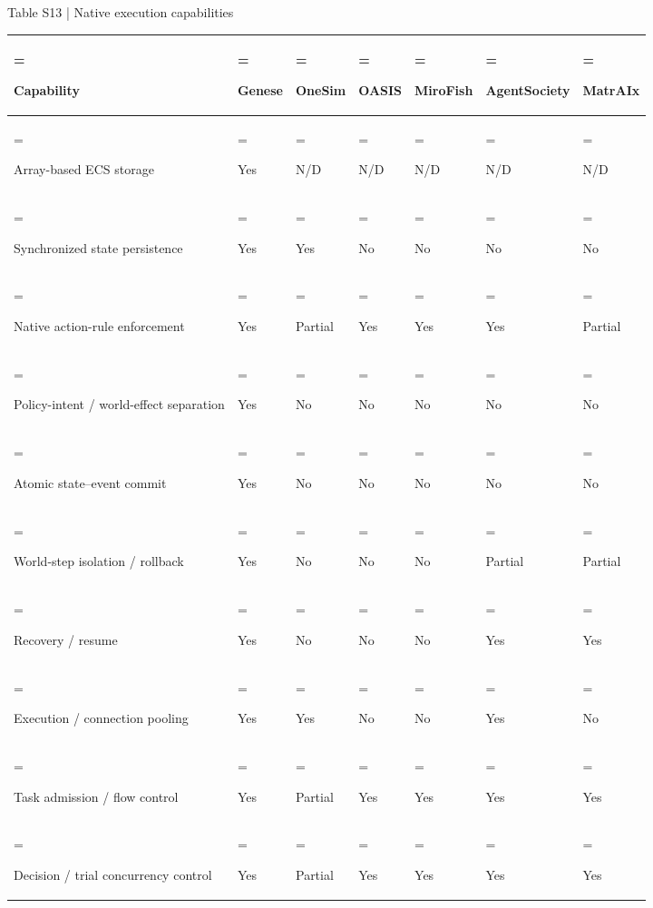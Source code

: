 \documentclass[10pt]{article}
\begin{document}
\begin{center}
\begin{minipage}{\textwidth}
\fontsize{8.5}{10.3}\selectfont
Table S13 | Native execution capabilities
\par\vspace{4pt}
\begin{tabularx}{\textwidth}{@{}>{\hsize=2.200000\hsize\linewidth=\hsize\raggedright\arraybackslash}X>{\hsize=0.640000\hsize\linewidth=\hsize\raggedright\arraybackslash}X>{\hsize=0.800000\hsize\linewidth=\hsize\raggedright\arraybackslash}X>{\hsize=0.800000\hsize\linewidth=\hsize\raggedright\arraybackslash}X>{\hsize=0.800000\hsize\linewidth=\hsize\raggedright\arraybackslash}X>{\hsize=0.960000\hsize\linewidth=\hsize\raggedright\arraybackslash}X>{\hsize=0.800000\hsize\linewidth=\hsize\raggedright\arraybackslash}X@{}}
\toprule
Capability & Genese & OneSim & OASIS & MiroFish & AgentSociety & MatrAIx \\
\midrule
Array-based ECS storage & Yes & N/D & N/D & N/D & N/D & N/D \\
Synchronized state persistence & Yes & Yes & No & No & No & No \\
Native action-rule enforcement & Yes & Partial & Yes & Yes & Yes & Partial \\
Policy-intent / world-effect separation & Yes & No & No & No & No & No \\
Atomic state–event commit & Yes & No & No & No & No & No \\
World-step isolation / rollback & Yes & No & No & No & Partial & Partial \\
Recovery / resume & Yes & No & No & No & Yes & Yes \\
Execution / connection pooling & Yes & Yes & No & No & Yes & No \\
Task admission / flow control & Yes & Partial & Yes & Yes & Yes & Yes \\
Decision / trial concurrency control & Yes & Partial & Yes & Yes & Yes & Yes \\
\bottomrule
\end{tabularx}
\par{}
\end{minipage}
\end{center}
\end{document}
